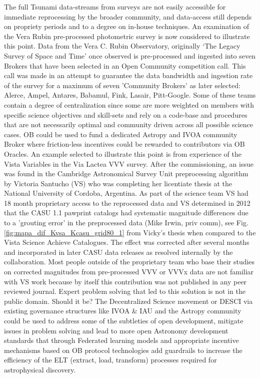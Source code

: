 \documentclass[final,5p,times,twocolumn,authoryear]{elsarticle}
\begin{document}
The full Tsunami data-streams from surveys are not easily accessible for immediate reprocessing by the broader community, and data-access still depends on propriety periods and to a degree on in-house techniques. An examination of the Vera Rubin pre-processed photometric survey is now considered to illustrate this point. Data from the Vera C. Rubin Observatory, originally `The Legacy Survey of Space and Time' once observed is pre-processed and ingested into seven Brokers that have been selected in an Open Community competition call.  This call was made in an attempt to guarantee the data bandwidth and ingestion rate of the survey for a maximum of seven 'Community Brokers' as later selected: Alerce, Ampel, Antares, Babamul, Fink, Lasair, Pitt-Google. Some of these teams contain a degree of centralization since some are more weighted on members with specific science objectives and skill-sets and rely on a code-base and procedures that are not necessarily optimal and community driven across all possible science cases. OB could be used to fund a dedicated Astropy and IVOA community Broker where friction-less incentives could be rewarded to contributors via OB Oracles. An example selected to illustrate this point is from experience of the Vista Variables in the Via Lactea VVV survey. After the commissioning, an issue was found in the Cambridge Astronomical Survey Unit preprocessing algorithm by Victoria Santucho (VS) who was completing her licentiate thesis at the National University of Cordoba, Argentina. As part of the science team VS had 18 month proprietary access to the reprocessed data and VS determined in 2012 that the CASU 1.1 pawprint catalogs had systematic magnitude differences due to a 'grouting error' in the preprocessed data (Mike Irwin, priv comm), see Fig. \ref{fig:mapa_dif_Kvsa_Kcasu_grid80_1} from Vicky's thesis when compared to the Vista Science Achieve Catalogues. The effect was corrected after several months and incorporated in later CASU data releases as resolved internally by the collaboration. Most people outside of the proprietary team who base their studies on corrected magnitudes from pre-processed VVV or VVVx data are not familiar with VS work because by itself this contribution was not published in any peer reviewed journal. Expert problem solving that led to this solution is not in the public domain. Should it be? The Decentralized Science movement or DESCI via existing governance structures like IVOA \& IAU and the Astropy community could be used to address some of the subtleties of open development, mitigate issues in problem solving and lead to more open Astronomy development standards that through Federated learning models and appropriate incentive mechanisms based on OB protocol technologies add guardrails to increase the efficiency of the ELT (extract, load, transform) processes required for astrophysical discovery.
\end{document}
